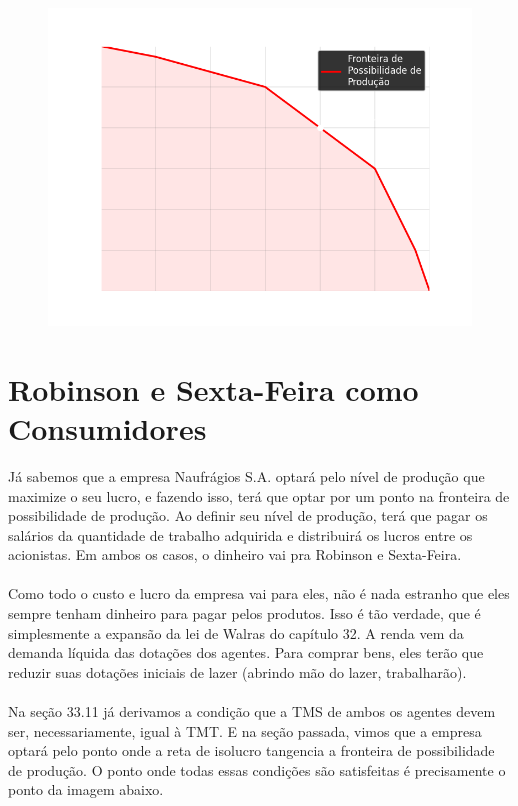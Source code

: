 \documentclass[a4paper,11pt,oneside]{book}
\theoremstyle{definition}
\theoremstyle{break}
\begin{document}
\begin{figure}[H]
	\centering
	\includegraphics[scale=0.6]{cap33_12-max_lucros.png}
\end{figure}

\section{Robinson e Sexta-Feira como Consumidores}

Já sabemos que a empresa Naufrágios S.A. optará pelo nível de produção que maximize o seu lucro, e fazendo isso, terá que optar por um ponto na fronteira de possibilidade de produção. Ao definir seu nível de produção, terá que pagar os salários da quantidade de trabalho adquirida e distribuirá os lucros entre os acionistas. Em ambos os casos, o dinheiro vai pra Robinson e Sexta-Feira.
\\
\\
Como todo o custo e lucro da empresa vai para eles, não é nada estranho que eles sempre tenham dinheiro para pagar pelos produtos. Isso é tão verdade, que é simplesmente a expansão da lei de Walras do capítulo 32. A renda vem da demanda líquida das dotações dos agentes. Para comprar bens, eles terão que reduzir suas dotações iniciais de lazer (abrindo mão do lazer, trabalharão).
\\
\\
Na seção 33.11 já derivamos a condição que a TMS de ambos os agentes devem ser, necessariamente, igual à TMT. E na seção passada, vimos que a empresa optará pelo ponto onde a reta de isolucro tangencia a fronteira de possibilidade de produção. O ponto onde todas essas condições são satisfeitas é precisamente o ponto da imagem abaixo.
\end{document}
